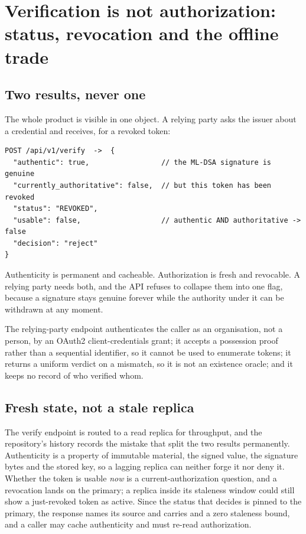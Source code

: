 \section{Verification is not authorization: status, revocation and the offline trade}
\label{sec:authorization}

\subsection{Two results, never one}

The whole product is visible in one object. A relying party asks the issuer about a credential and
receives, for a revoked token:

\begin{lstlisting}
POST /api/v1/verify  ->  {
  "authentic": true,                 // the ML-DSA signature is genuine
  "currently_authoritative": false,  // but this token has been revoked
  "status": "REVOKED",
  "usable": false,                   // authentic AND authoritative -> false
  "decision": "reject"
}
\end{lstlisting}

Authenticity is permanent and cacheable. Authorization is fresh and revocable. A relying party needs
both, and the API refuses to collapse them into one flag, because a signature stays genuine forever
while the authority under it can be withdrawn at any moment. \sImpl

The relying-party endpoint authenticates the caller as an organisation, not a person, by an OAuth2
client-credentials grant; it accepts a possession proof rather than a sequential identifier, so it
cannot be used to enumerate tokens; it returns a uniform verdict on a mismatch, so it is not an
existence oracle; and it keeps no record of who verified whom. \sImpl

\subsection{Fresh state, not a stale replica}

The verify endpoint is routed to a read replica for throughput, and the repository's history
records the mistake that split the two results permanently. Authenticity is a property of immutable
material, the signed value, the signature bytes and the stored key, so a lagging replica can neither
forge it nor deny it. Whether the token is usable \emph{now} is a current-authorization question, and
a revocation lands on the primary; a replica inside its staleness window could still show a
just-revoked token as active. Since  the status that decides  is pinned to
the primary, the response names its source and carries  and a zero staleness bound, and
a caller may cache authenticity and must re-read authorization. \sImpl

